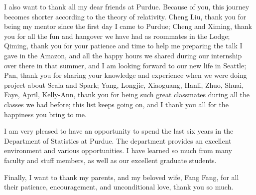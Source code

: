 \begin{acknowledgments}
I also want to thank all my dear friends at Purdue. Because of you, this journey
becomes shorter according to the theory of relativity. Cheng Liu, thank you for 
being my mentor since the first day I came to Purdue; Cheng and Ximing, thank you 
for all the fun and hangover we have had as roommates in the Lodge; Qiming, thank 
you for your patience and time to help me preparing the talk I gave in the Amazon, 
and all the happy hours we shared during our internship over there in that summer,
and I am looking forward to our new life in Seattle; Pan, thank you for sharing 
your knowledge and experience when we were doing project about Scala and Spark; 
Yang, Longjie, Xiaoguang, Hanli, Zhuo, Shuai, Faye, April, Kelly-Ann, thank you 
for being such great classmates during all the classes we had before; this list 
keeps going on, and I thank you all for the happiness you bring to me.

I am very pleased to have an opportunity to spend the last six years in the 
Department of Statistics at Purdue. The department provides an excellent 
environment and various opportunities. I have learned so much from many faculty 
and stuff members, as well as our excellent graduate students.

Finally, I want to thank my parents, and my beloved wife, Fang Fang, for all 
their patience, encouragement, and unconditional love, thank you so much.

\end{acknowledgments}


\tableofcontents

